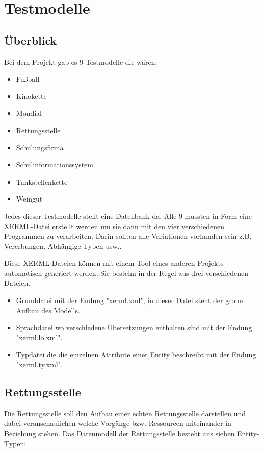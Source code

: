 \chapter{Testmodelle}
\label{cha:Testmodelle}
\fib{}
\section{Überblick}

\noindent
Bei dem Projekt gab es 9 Testmodelle die wären:
\begin{itemize}
    \item Fußball
    \item Kinokette
    \item Mondial
    \item Rettungsstelle
    \item Schulungsfirma
    \item Schulinformationssystem
    \item Tankstellenkette
    \item Weingut
\end{itemize}
\noindent

\noindent
Jedes dieser Testmodelle stellt eine Datenbank da. Alle 9 mussten in Form eine XERML-Datei erstellt werden um sie dann mit den vier verschiedenen Programmen zu verarbeiten. Darin sollten alle Variationen vorhanden sein z.B. Vererbungen, Abhängige-Typen usw..

\noindent
Diese XERML-Dateien können mit einem Tool eines anderen Projekts automatisch generiert werden.
Sie bestehn in der Regel aus drei verschiedenen Dateien.
\begin{itemize}
    \item Grunddatei mit der Endung "xerml.xml", in dieser Datei steht der grobe Aufbau des Modells.
    \item Sprachdatei wo verschiedene Übersetzungen enthalten sind mit der Endung "xerml.lo.xml".
    \item Typdatei die die einzelnen Attribute einer Entity beschreibt mit der Endung "xerml.ty.xml".
\end{itemize}


\newpage


\section{Rettungsstelle}
\fib{}

\noindent
Die Rettungsstelle soll den Aufbau einer echten Rettungsstelle darstellen und dabei veranschaulichen welche Vorgänge bzw. Ressourcen miteinander in Beziehung stehen.
Das Datenmodell der Rettungsstelle besteht aus sieben Entity-Typen:

